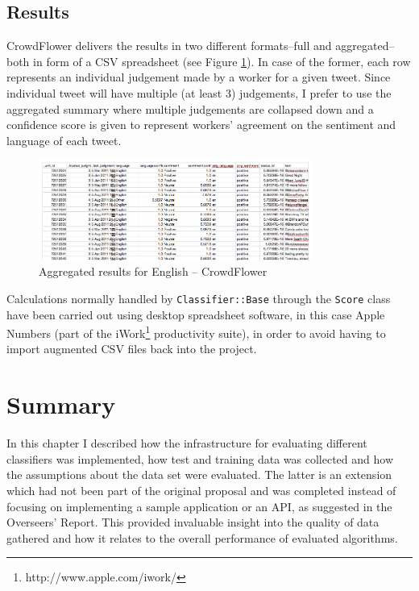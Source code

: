 \subsection{Results}

CrowdFlower delivers the results in two different formats--full and aggregated--both in form of a CSV spreadsheet (see Figure \ref{fig:crowdflower-results}). In case of the former, each row represents an individual judgement made by a worker for a given tweet. Since individual tweet will have multiple (at least 3) judgements, I prefer to use the aggregated summary where multiple judgements are collapsed down and a confidence score is given to represent workers' agreement on the sentiment and language of each tweet.

\begin{figure}[htb]
  \begin{center}
    \includegraphics[width=0.8\textwidth]{crowdflower-results.png}
    \caption{Aggregated results for English -- CrowdFlower}
    \label{fig:crowdflower-results}
  \end{center}
\end{figure}

Calculations normally handled by \verb|Classifier::Base| through the \verb|Score| class have been carried out using desktop spreadsheet software, in this case Apple Numbers (part of the iWork\footnote{http://www.apple.com/iwork/} productivity suite), in order to avoid having to import augmented CSV files back into the project.

\section{Summary}

In this chapter I described how the infrastructure for evaluating different classifiers was implemented, how test and training data was collected and how the assumptions about the data set were evaluated. The latter is an extension which had not been part of the original proposal and was completed instead of focusing on implementing a sample application or an API, as suggested in the Overseers' Report. This provided invaluable insight into the quality of data gathered and how it relates to the overall performance of evaluated algorithms.